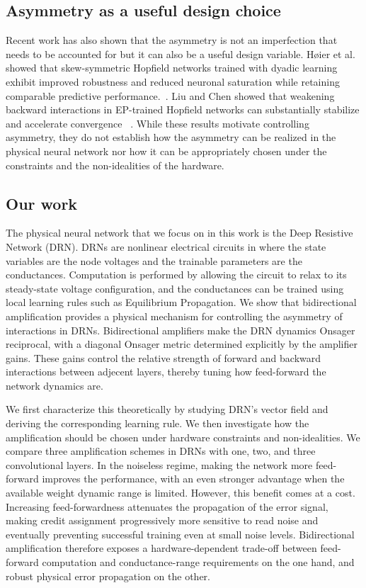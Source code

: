 \documentclass{article}
\begin{document}
\subsection{Asymmetry as a useful design choice}

Recent work has also shown that the asymmetry is not an imperfection that needs to be accounted for but it can also
be a useful design variable. Høier et al. showed that skew-symmetric Hopfield networks trained with dyadic learning exhibit improved robustness and reduced neuronal saturation while retaining comparable predictive performance.~\cite{hoier2024dyadic}. Liu and Chen showed that weakening
backward interactions in EP-trained Hopfield networks can substantially
stabilize and accelerate convergence ~\cite{liu2026practical}. While these results motivate controlling
asymmetry, they do not establish how the asymmetry can be realized in the physical neural network nor how it can be appropriately chosen under the constraints and the non-idealities of the hardware.

\subsection{Our work}
The physical neural network that we focus on in this work is the Deep Resistive Network (DRN). DRNs are nonlinear electrical circuits in where the state variables are the node voltages and the trainable parameters are the conductances. Computation is performed by allowing the circuit to relax to its steady-state voltage configuration, and the conductances can be trained using local learning rules such as Equilibrium Propagation.  
We show that bidirectional amplification provides a physical
mechanism for controlling the asymmetry of interactions in DRNs. Bidirectional amplifiers make the DRN dynamics Onsager reciprocal, with a
diagonal Onsager metric determined explicitly by the amplifier gains. These
gains control the relative strength of forward and backward interactions
between adjecent layers, thereby tuning how feed-forward the network
dynamics are.

We first characterize this theoretically by studying DRN's vector field and deriving the
corresponding learning rule. We then investigate how the amplification should be chosen under hardware constraints and
non-idealities. We compare three amplification schemes in DRNs with one, two,
and three convolutional layers. In the noiseless regime, making the network
more feed-forward improves the performance, with an even stronger
advantage when the available weight dynamic range is limited. However, this benefit comes at a cost. Increasing
feed-forwardness attenuates the propagation of the error signal,
making credit assignment progressively more sensitive to read noise and
eventually preventing successful training even at small noise levels.
Bidirectional amplification therefore exposes a hardware-dependent trade-off
between feed-forward computation and conductance-range requirements on the one
hand, and robust physical error propagation on the other.
\end{document}
